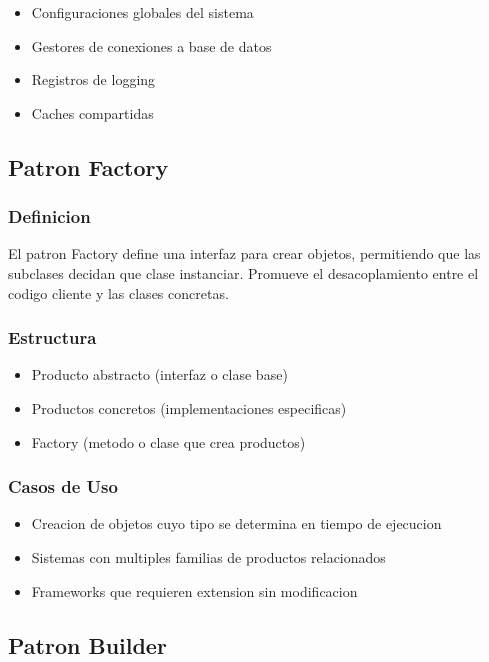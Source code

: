 \documentclass[11pt,a4paper]{article}
\begin{document}
\begin{itemize}
    \item Configuraciones globales del sistema
    \item Gestores de conexiones a base de datos
    \item Registros de logging
    \item Caches compartidas
\end{itemize}

\subsection{Patron Factory}

\subsubsection{Definicion}

El patron Factory define una interfaz para crear objetos, permitiendo que las subclases decidan que clase instanciar. Promueve el desacoplamiento entre el codigo cliente y las clases concretas.

\subsubsection{Estructura}

\begin{itemize}
    \item Producto abstracto (interfaz o clase base)
    \item Productos concretos (implementaciones especificas)
    \item Factory (metodo o clase que crea productos)
\end{itemize}

\subsubsection{Casos de Uso}

\begin{itemize}
    \item Creacion de objetos cuyo tipo se determina en tiempo de ejecucion
    \item Sistemas con multiples familias de productos relacionados
    \item Frameworks que requieren extension sin modificacion
\end{itemize}

\subsection{Patron Builder}
\end{document}
